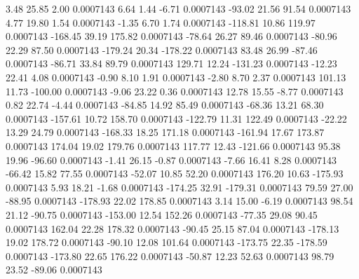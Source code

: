         3.48       25.85        2.00     0.0007143
        6.64        1.44       -6.71     0.0007143
      -93.02       21.56       91.54     0.0007143
        4.77       19.80        1.54     0.0007143
       -1.35        6.70        1.74     0.0007143
     -118.81       10.86      119.97     0.0007143
     -168.45       39.19      175.82     0.0007143
      -78.64       26.27       89.46     0.0007143
      -80.96       22.29       87.50     0.0007143
     -179.24       20.34     -178.22     0.0007143
       83.48       26.99      -87.46     0.0007143
      -86.71       33.84       89.79     0.0007143
      129.71       12.24     -131.23     0.0007143
      -12.23       22.41        4.08     0.0007143
       -0.90        8.10        1.91     0.0007143
       -2.80        8.70        2.37     0.0007143
      101.13       11.73     -100.00     0.0007143
       -9.06       23.22        0.36     0.0007143
       12.78       15.55       -8.77     0.0007143
        0.82       22.74       -4.44     0.0007143
      -84.85       14.92       85.49     0.0007143
      -68.36       13.21       68.30     0.0007143
     -157.61       10.72      158.70     0.0007143
     -122.79       11.31      122.49     0.0007143
      -22.22       13.29       24.79     0.0007143
     -168.33       18.25      171.18     0.0007143
     -161.94       17.67      173.87     0.0007143
      174.04       19.02      179.76     0.0007143
      117.77       12.43     -121.66     0.0007143
       95.38       19.96      -96.60     0.0007143
       -1.41       26.15       -0.87     0.0007143
       -7.66       16.41        8.28     0.0007143
      -66.42       15.82       77.55     0.0007143
      -52.07       10.85       52.20     0.0007143
      176.20       10.63     -175.93     0.0007143
        5.93       18.21       -1.68     0.0007143
     -174.25       32.91     -179.31     0.0007143
       79.59       27.00      -88.95     0.0007143
     -178.93       22.02      178.85     0.0007143
        3.14       15.00       -6.19     0.0007143
       98.54       21.12      -90.75     0.0007143
     -153.00       12.54      152.26     0.0007143
      -77.35       29.08       90.45     0.0007143
      162.04       22.28      178.32     0.0007143
      -90.45       25.15       87.04     0.0007143
     -178.13       19.02      178.72     0.0007143
      -90.10       12.08      101.64     0.0007143
     -173.75       22.35     -178.59     0.0007143
     -173.80       22.65      176.22     0.0007143
      -50.87       12.23       52.63     0.0007143
       98.79       23.52      -89.06     0.0007143
